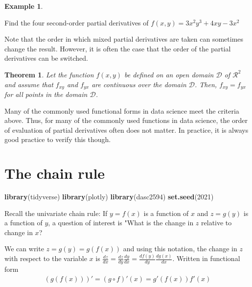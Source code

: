 \documentclass[
]{book}
\newenvironment{Shaded}{\begin{snugshade}}{\end{snugshade}}
\newcommand{\DecValTok}[1]{\textcolor[rgb]{0.00,0.00,0.81}{#1}}
\newcommand{\KeywordTok}[1]{\textcolor[rgb]{0.13,0.29,0.53}{\textbf{#1}}}
\newcommand{\NormalTok}[1]{#1}
\newtheorem{theorem}{Theorem}[chapter]
\theoremstyle{definition}
\theoremstyle{definition}
\newtheorem{example}{Example}[chapter]
\theoremstyle{definition}
\theoremstyle{remark}
\begin{document}
\begin{example}
\protect\hypertarget{exm:unlabeled-div-216}{}\label{exm:unlabeled-div-216}

Find the four second-order partial derivatives of \(f(x, y) = 3x^2y^3 + 4xy - 3x^2\)

\end{example}

Note that the order in which mixed partial derivatives are taken can sometimes change the result. However, it is often the case that the order of the partial derivatives can be switched.

\begin{theorem}
\protect\hypertarget{thm:unnamed-chunk-278}{}{\label{thm:unnamed-chunk-278} }Let the function \(f(x, y)\) be defined on an open domain \(\mathcal{D}\) of \(\mathcal{R}^2\) and assume that \(f_{xy}\) and \(f_{yx}\) are continuous over the domain \(\mathcal{D}\). Then, \(f_{xy} = f_{yx}\) for all points in the domain \(\mathcal{D}\).
\end{theorem}

Many of the commonly used functional forms in data science meet the criteria above. Thus, for many of the commonly used functions in data science, the order of evaluation of partial derivatives often does not matter. In practice, it is always good practice to verify this though.

\hypertarget{the-chain-rule}{%
\chapter{The chain rule}\label{the-chain-rule}}

\begin{Shaded}
\begin{Highlighting}[]
\KeywordTok{library}\NormalTok{(tidyverse)}
\KeywordTok{library}\NormalTok{(plotly)}
\KeywordTok{library}\NormalTok{(dasc2594)}
\KeywordTok{set.seed}\NormalTok{(}\DecValTok{2021}\NormalTok{)}
\end{Highlighting}
\end{Shaded}

Recall the univariate chain rule: If \(y = f(x)\) is a function of \(x\) and \(z = g(y)\) is a function of \(y\), a question of interest is "What is the change in \(z\) relative to change in \(x\)?

We can write \(z = g(y) = g(f(x))\) and using this notation, the change in \(z\) with respect to the variable \(x\) is \(\frac{dz}{dx} = \frac{dz}{dy}\frac{dy}{dx} = \frac{df(y)}{dy}\frac{dg(x)}{dx}\). Written in functional form
\[
\begin{aligned}
(g(f(x)))' = (g \circ f)'(x) = g'(f(x)) f'(x)
\end{aligned}
\]
\end{document}
